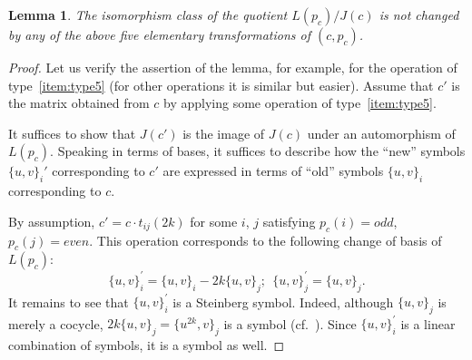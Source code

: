 \documentclass[oneside, 10pt]{amsart}
\theoremstyle{plain}
\newtheorem{lemma}{Lemma}
\theoremstyle{remark}
\theoremstyle{definition}
\begin{document}
\begin{lemma} \label{lm:inv} The isomorphism class of the quotient $L(p_c)/J(c)$ is not changed
 by any of the above five elementary transformations of $(c, p_c)$. \end{lemma}
\begin{proof}
 Let us verify the assertion of the lemma, for example, for the operation of type~\eqref{item:type5}
  (for other operations it is similar but easier).
 Assume that $c'$ is the matrix obtained from $c$ by applying some operation of type~\eqref{item:type5}.
 
 It suffices to show that $J(c')$ is the image of $J(c)$ under an automorphism of $L(p_c)$.
 Speaking in terms of bases, it suffices to describe how the ``new'' symbols $\{u, v\}_i'$ corresponding to $c'$ 
  are expressed in terms of ``old'' symbols $\{u, v\}_i$ corresponding to $c$.  
 
 By assumption, $c' = c \cdot t_{ij}(2k)$ for some $i$, $j$ satisfying $p_c(i)=odd$, $p_c(j)=even$.
 This operation corresponds to the following change of basis of $L(p_c)$:
 \[ \{u, v\}_{i}^{'} = \{u, v\}_i - 2k\{u, v\}_j;\ \ \{u, v\}_{j}^{'} = \{u, v\}_j.\]
 It remains to see that $\{u, v\}_{i}^{'}$ is a Steinberg symbol.
 Indeed, although $\{u, v\}_j$ is merely a cocycle, $2k\{u, v\}_j = \{u^{2k}, v\}_j$ is a symbol (cf.~\cite[Lemma~3.2(vii)]{MW}).
 Since $\{u, v\}_{i}^{'}$ is a linear combination of symbols, it is a symbol as well.
\end{proof}
\end{document}
